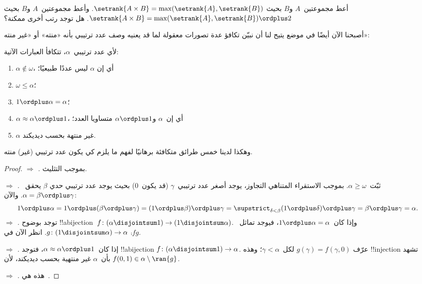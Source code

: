 \documentclass[../../../include/open-logic-section]{subfiles}
\begin{document}
\begin{prob}
أعط مجموعتين~$A$ و$B$ بحيث
$\setrank{A \times B} =
\max(\setrank{A}, \setrank{B})$. وأعط مجموعتين~$A$ و$B$ بحيث
$\setrank{A \times B} =
\max(\setrank{A}, \setrank{B}) \ordplus 2$. هل توجد رتب أخرى ممكنة؟
\end{prob}

أصبحنا الآن أيضًا في موضع يتيح لنا أن نبيّن تكافؤ عدة تصورات معقولة
لما قد يعنيه وصف عدد ترتيبي بأنه «منته» أو «غير منته»:

\begin{lem}
لأي عدد ترتيبي~$\alpha$، تتكافأ العبارات الآتية:
\begin{enumerate}
	\item{} $\alpha\notin \omega$، أي إن
	$\alpha$ ليس عددًا طبيعيًا؛
	\item{} $\omega \leq \alpha$؛
	\item{} $1 \ordplus \alpha = \alpha$؛
	\item{} $\alpha \approx \alpha\ordplus 1$، أي
	إن~$\alpha$ و$\alpha\ordplus 1$ متساويا العدد؛
	\item{} $\alpha$ غير منتهة بحسب ديديكند.
	\end{enumerate}
\end{lem}
\noindent
وهكذا لدينا خمس طرائق متكافئة برهانيًا لفهم ما يلزم كي يكون عدد
ترتيبي (غير) منته.

\begin{proof}
\emph{ $\Rightarrow$ .}
بموجب التثليث.

\emph{ $\Rightarrow$ .}
ثبّت~$\alpha \geq \omega$. بموجب الاستقراء المتناهي التجاوز، يوجد
أصغر عدد ترتيبي~$\gamma$ (قد يكون~$0$) بحيث يوجد عدد ترتيبي حدي
$\beta$ يحقق~$\alpha = \beta \ordplus \gamma$. والآن:
\[
	1 \ordplus \alpha =
	1 \ordplus (\beta \ordplus \gamma) =
	(1 \ordplus \beta) \ordplus \gamma =
	\supstrict_{\delta < \beta} (1 \ordplus \delta) \ordplus \gamma =
	\beta \ordplus \gamma =
	\alpha.
\]
\emph{ $\Rightarrow$ .} توجد
بوضوح !!a{bijection}~$f \colon (\alpha \disjointsum 1) \to (1
\disjointsum \alpha)$. وإذا كان~$1 \ordplus \alpha = \alpha$، فيوجد
تماثل~$g \colon (1 \disjointsum \alpha) \to \alpha$. انظر الآن في
$\comp{f}{g}$.

\emph{ $\Rightarrow$ .} إذا
كان~$\alpha \approx \alpha \ordplus 1$، فتوجد !!a{bijection}
$f \colon (\alpha \disjointsum 1) \to \alpha$. عرّف
$g(\gamma) = f(\gamma, 0)$ لكل~$\gamma < \alpha$؛ وهذه
!!{injection} تشهد بأن~$\alpha$ غير منتهية بحسب ديديكند، لأن
$f(0,1) \in \alpha \setminus \ran{g}$.

\emph{ $\Rightarrow$ .}
هذه هي~.
\end{proof}
\end{document}
